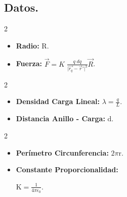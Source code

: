 \documentclass[a4paper,12pt]{article} %
\begin{document}
\vspace{\baselineskip}

\subsection{Datos.}

\vspace{\baselineskip}

\begin{multicols}{2}
	\begin{itemize}
		\item \textbf{Radio:} \(\mathrm{R}\).
	\end{itemize}

	\columnbreak

	\begin{itemize}
		\item \textbf{Fuerza:} \(\vec{F} = K \; \frac{q \; dq}{\vert \vec{r_q} - \vec{r}'  \vert^3} \vec{R}\).
	\end{itemize}
\end{multicols}

\begin{multicols}{2}
	\begin{itemize}
		\item \textbf{Densidad Carga Lineal:} \(\lambda = \frac{q}{L}\).
	\end{itemize}

	\columnbreak

	\begin{itemize}
		\item \textbf{Distancia Anillo - Carga:} \( \mathrm{d}\).
	\end{itemize}

\end{multicols}

\begin{multicols}{2}
	\begin{itemize}
		\item \textbf{Perímetro Circunferencia:} \(2\pi\mathrm{r}\).
	\end{itemize}

	\columnbreak

	\begin{itemize}
		\item \textbf{Constante Proporcionalidad:}

		      \( \mathrm{K} = \frac{1}{4 \pi \epsilon_0}\).
	\end{itemize}

\end{multicols}
\end{document}

